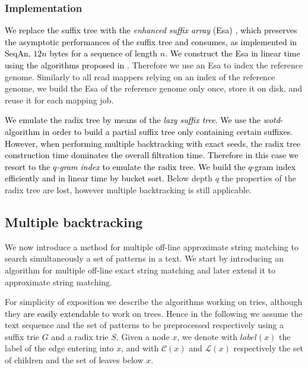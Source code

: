 \documentclass[a4,center,fleqn]{article}
\begin{document}
\subsubsection{Implementation}

\textcolor{black}{
We replace the suffix tree with the \emph{enhanced suffix array} (Esa) \cite{Abouelhoda2004}, which preserves the asymptotic performances of the suffix tree and consumes, as implemented in SeqAn, $12n$ bytes for a sequence of length $n$. We construct the Esa in linear time using the algorithms proposed in \cite{Karkkainen2003,Kasai2001,Abouelhoda2004}.}
Therefore we use an Esa to index the reference genome.
Similarly to all read mappers relying on an index of the reference genome, we build the Esa of the reference genome only once, store it on disk, and reuse it for each mapping job.

\textcolor{black}{
We emulate the radix tree by means of the \emph{lazy suffix tree}.
We use the \emph{wotd}-algorithm \cite{Giegerich1999} in order to build a partial suffix tree only containing certain suffixes.
However, when performing multiple backtracking with exact seeds, the radix tree construction time dominates the overall filtration time.
Therefore in this case we resort to the \emph{$q$-gram index} to emulate the radix tree.
We build the $q$-gram index efficiently and in linear time by bucket sort.}
Below depth $q$ the properties of the radix tree are lost, however multiple backtracking is still applicable.


\subsection{Multiple backtracking}
\label{sub:MultipleBacktracking}

We now introduce a method for multiple off-line approximate string matching to search simultaneously a set of patterns in a text.
We start by introducing an algorithm for multiple off-line exact string matching and later extend it to approximate string matching.

For simplicity of exposition we describe the algorithms working on tries, although they \textcolor{black}{are easily extendable} to work on trees.
Hence in the following we assume the text sequence and the set of patterns to be preprocessed respectively using a suffix trie $G$ and a radix trie $S$.
Given a node $x$, we denote with $label(x)$ the label of the edge entering into $x$, and with $\mathcal{C}(x)$ and $\mathcal{L}(x)$ respectively the set of children and the set of leaves below $x$.
\end{document}
